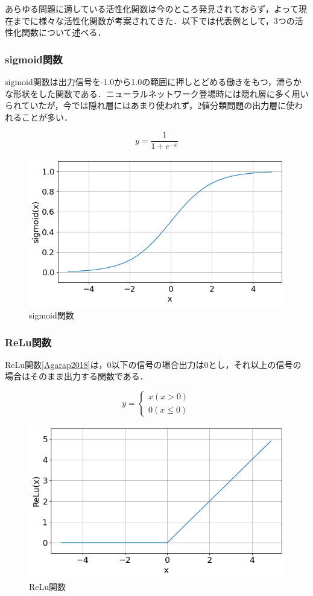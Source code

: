\documentclass[a4j, 11pt]{jreport}
\begin{document}
あらゆる問題に適している活性化関数は今のところ発見されておらず，よって現在までに様々な活性化関数が考案されてきた．以下では代表例として，3つの活性化関数について述べる．
\subsubsection{sigmoid関数}
sigmoid関数は出力信号を-1.0から1.0の範囲に押しとどめる働きをもつ，滑らかな形状をした関数である．ニューラルネットワーク登場時には隠れ層に多く用いられていたが，今では隠れ層にはあまり使われず，2値分類問題の出力層に使われることが多い．

\begin{equation}
 y = \frac{1}{1 + e^{-x}}
 \label{eq:sigmoid}
\end{equation}

\begin{figure}[H]
 \centering
 \includegraphics[width=0.7\hsize, keepaspectratio]{images/sigmoid.png}
 \caption{sigmoid関数}
 \label{fig:sigmoid}
\end{figure}

\subsubsection{ReLu関数}
ReLu関数\ref{Agarap2018}は，0以下の信号の場合出力は0とし，それ以上の信号の場合はそのまま出力する関数である．

\begin{equation}
  y= \left \{
  \begin{array}{l}
  x　(x > 0)\\
  0　(x \leq 0)
  \end{array}
  \right.
  \label{eq:relu}
  \end{equation}

\begin{figure}[H]
  \centering
  \includegraphics[width=0.7\hsize, keepaspectratio]{images/relu.png}
  \caption{ReLu関数}
  \label{fig:relu}
 \end{figure}
\end{document}
